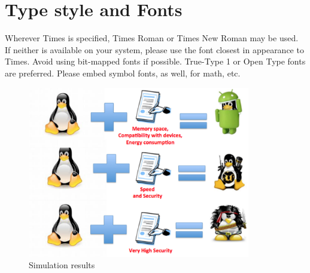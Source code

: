 \documentclass[10pt, conference, compsocconf]{IEEEtran}
\begin{document}
\section{Type style and Fonts}
Wherever Times is specified, Times Roman or Times New Roman may be used. If neither is available on your system, please use the font closest in appearance to Times. Avoid using bit-mapped fonts if possible. True-Type 1 or Open Type fonts are preferred. Please embed symbol fonts, as well, for math, etc.


%
%


%

\begin{figure}[!t]
\centering
\includegraphics[width=3.825420899762476in]{tux.png}%
\caption{Simulation results}
\label{fig_sim}
\vspace*{-7mm}
\end{figure}
\end{document}
